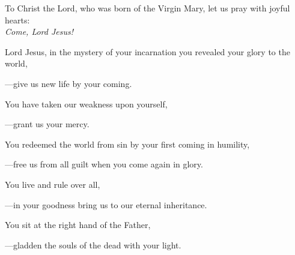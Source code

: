 \intercessions\indent

\begin{hangpar}

To Christ the Lord, who was born of the Virgin Mary, let us pray with joyful hearts:\\
\emph{Come, Lord Jesus!}

\medskip Lord Jesus, in the mystery of your incarnation you revealed your glory to the world,

{\color{red}---\thinspace}give us new life by your coming.

\medskip You have taken our weakness upon yourself,

{\color{red}---\thinspace}grant us your mercy.

\medskip You redeemed the world from sin by your first coming in humility,

{\color{red}---\thinspace}free us from all guilt when you come again in glory.

\medskip You live and rule over all,

{\color{red}---\thinspace}in your goodness bring us to our eternal inheritance.

\medskip You sit at the right hand of the Father,

{\color{red}---\thinspace}gladden the souls of the dead with your light.

\medskip

\end{hangpar}